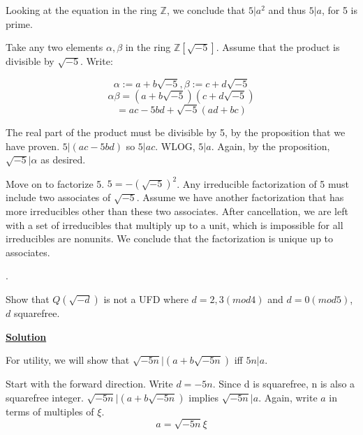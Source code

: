 \documentclass{article}
\newcommand{\new}[1]{
    \vspace{2mm}
    \noindent
    \textbf{
    \underline{#1}}
}
\newcounter{problemcnt}
\newcommand{\Problem}{{
    \vspace{5mm}
    \stepcounter{problemcnt}
    \noindent
    \arabic{problemcnt}. 
}
}
\begin{document}
Looking at the equation in the ring $\mathbb{Z}$,
we conclude that $5|a^2$ and thus $5|a$, for 5 is prime. 

Take any two elements $\alpha, \beta$ in 
the ring $\mathbb{Z}[\sqrt{-5}]$. Assume 
that the product is divisible by 
$\sqrt{-5}$. Write:

\[
    \alpha := a + b\sqrt{-5},
    \beta := c + d\sqrt{-5}
\]
\[
    \alpha\beta = (a + b\sqrt{-5})
    (c + d\sqrt{-5})
\]
\[
    = ac-5bd+\sqrt{-5}(ad+bc)
\]

The real part of the product must be 
divisible by 5, by the proposition that 
we have proven. $5|(ac-5bd)$ so 
$5|ac$. WLOG, $5|a$. Again, by the proposition,
$\sqrt{-5}|\alpha$ as desired. 

Move on to factorize 5. $5 = -(\sqrt{-5})^2$. 
Any irreducible factorization of 5 must 
include two associates of $\sqrt{-5}$. 
Assume we have another factorization that 
has more irreducibles other than these 
two associates. After cancellation, 
we are left with a set of irreducibles 
that multiply up to a unit, which is 
impossible for all irreducibles are nonunits. 
We conclude that the factorization is unique 
up to associates. 


\Problem
Show that $Q(\sqrt{-d})$ is not a UFD
where $d = 2, 3(mod 4)$ and 
$d = 0(mod 5)$, $d$ squarefree. 

\new{Solution}

\begin{comment}
First, we establish that $\sqrt{-d}$
is an irreducible, regarless of the 
value of d. AFC, some ring element 
$\alpha = a + b\sqrt{-d}$ divides $\sqrt{d}$ 
where $\alpha \neq 0$ and $\alpha \neq \pm 
\sqrt{d}$. 

Write:

\[
    N(\alpha) | N(\sqrt{-d})
\]
\[
    (a^2-b^2d)|d
\]
So we infer $gcd(a^2-b^2d, d) = d$. 
$gcd(a^2-b^2d, d) = gcd(a^2, d) = d$,
so $d|a^2$. Since d is squarefree, 
by unique factorization in the integers, 
we get $d|a$. Write $a = d\bar(a)$. 

\end{comment}

For utility, we will show that 
$\sqrt{-5n}|(a+b\sqrt{-5n})$ iff 
$5n|a$.  

Start with the forward direction. 
Write $d = -5n$. Since d is squarefree, 
n is also a squarefree integer. 
$\sqrt{-5n}|(a+b\sqrt{-5n})$ implies
$\sqrt{-5n}|a$. Again, write $a$ in terms 
of multiples of $\xi$. 
\[
    a = \sqrt{-5n}\xi
\]
\end{document}
